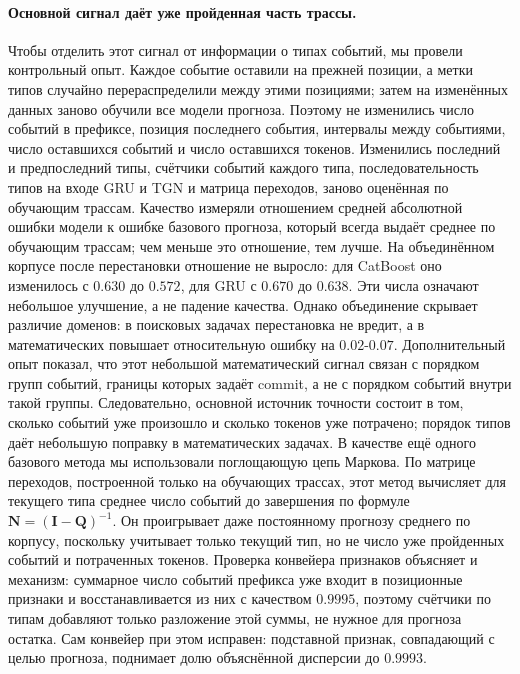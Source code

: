 \documentclass[11pt]{article}
\begin{document}
\paragraph{Основной сигнал даёт уже пройденная часть трассы.} Чтобы отделить этот сигнал от информации о типах событий, мы провели контрольный опыт. Каждое событие оставили на прежней позиции, а метки типов случайно перераспределили между этими позициями; затем на изменённых данных заново обучили все модели прогноза. Поэтому не изменились число событий в префиксе, позиция последнего события, интервалы между событиями, число оставшихся событий и число оставшихся токенов. Изменились последний и предпоследний типы, счётчики событий каждого типа, последовательность типов на входе GRU и TGN и матрица переходов, заново оценённая по обучающим трассам. Качество измеряли отношением средней абсолютной ошибки модели к ошибке базового прогноза, который всегда выдаёт среднее по обучающим трассам; чем меньше это отношение, тем лучше. На объединённом корпусе после перестановки отношение не выросло: для CatBoost оно изменилось с $0.630$ до $0.572$, для GRU с $0.670$ до $0.638$. Эти числа означают небольшое улучшение, а не падение качества. Однако объединение скрывает различие доменов: в поисковых задачах перестановка не вредит, а в математических повышает относительную ошибку на $0.02$-$0.07$. Дополнительный опыт показал, что этот небольшой математический сигнал связан с порядком групп событий, границы которых задаёт \textsf{commit}, а не с порядком событий внутри такой группы. Следовательно, основной источник точности состоит в том, сколько событий уже произошло и сколько токенов уже потрачено; порядок типов даёт небольшую поправку в математических задачах. В качестве ещё одного базового метода мы использовали поглощающую цепь Маркова. По матрице переходов, построенной только на обучающих трассах, этот метод вычисляет для текущего типа среднее число событий до завершения по формуле $\mathbf N=(\mathbf I-\mathbf Q)^{-1}$. Он проигрывает даже постоянному прогнозу среднего по корпусу, поскольку учитывает только текущий тип, но не число уже пройденных событий и потраченных токенов. Проверка конвейера признаков объясняет и механизм: суммарное число событий префикса уже входит в позиционные признаки и восстанавливается из них с качеством $0.9995$, поэтому счётчики по типам добавляют только разложение этой суммы, не нужное для прогноза остатка. Сам конвейер при этом исправен: подставной признак, совпадающий с целью прогноза, поднимает долю объяснённой дисперсии до $0.9993$.
\end{document}
